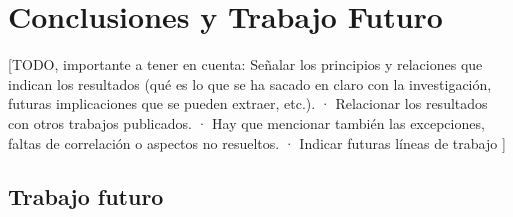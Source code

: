 \chapter{Conclusiones y Trabajo Futuro}
\label{cap:conclusiones}


[TODO, importante a tener en cuenta:
Señalar los principios y relaciones que indican los resultados (qué es lo que se ha sacado en claro con la investigación, futuras implicaciones que se pueden extraer, etc.).
· Relacionar los resultados con otros trabajos publicados.
· Hay que mencionar también las excepciones, faltas de correlación o aspectos no resueltos.
· Indicar futuras líneas de trabajo
]

\section*{Trabajo futuro}